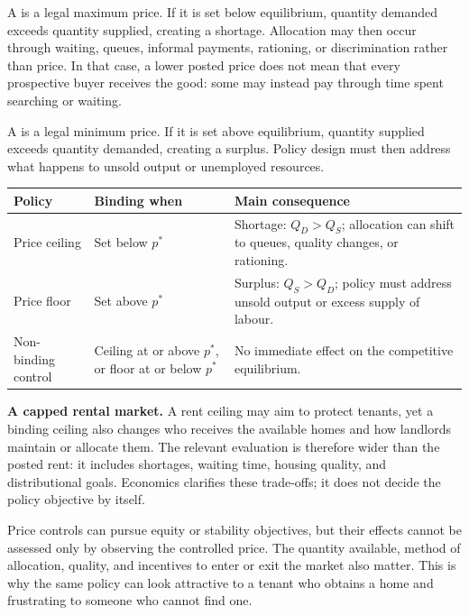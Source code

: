 A  is a legal maximum price. If it is set below
equilibrium, quantity demanded exceeds quantity supplied, creating a shortage.
Allocation may then occur through waiting, queues, informal payments,
rationing, or discrimination rather than price. In that case, a lower posted
price does not mean that every prospective buyer receives the good: some may
instead pay through time spent searching or waiting.

A  is a legal minimum price. If it is set above
equilibrium, quantity supplied exceeds quantity demanded, creating a surplus.
Policy design must then address what happens to unsold output or unemployed
resources.

\begin{center}
\small
\begin{tabular}{p{}p{}p{}}
\toprule
Policy & Binding when & Main consequence \\
\midrule
Price ceiling & Set below $p^*$ & Shortage: $Q_D>Q_S$; allocation can shift to queues, quality changes, or rationing. \\
Price floor & Set above $p^*$ & Surplus: $Q_S>Q_D$; policy must address unsold output or excess supply of labour. \\
Non-binding control & Ceiling at or above $p^*$, or floor at or below $p^*$ & No immediate effect on the competitive equilibrium. \\
\bottomrule
\end{tabular}
\end{center}

\begin{exercisebox}
\textbf{A capped rental market.}
A rent ceiling may aim to protect tenants, yet a binding ceiling also changes
who receives the available homes and how landlords maintain or allocate them.
The relevant evaluation is therefore wider than the posted rent: it includes
shortages, waiting time, housing quality, and distributional goals. Economics
clarifies these trade-offs; it does not decide the policy objective by itself.
\end{exercisebox}

Price controls can pursue equity or stability objectives, but their effects
cannot be assessed only by observing the controlled price. The quantity
available, method of allocation, quality, and incentives to enter or exit the
market also matter. This is why the same policy can look attractive to a
tenant who obtains a home and frustrating to someone who cannot find one.

